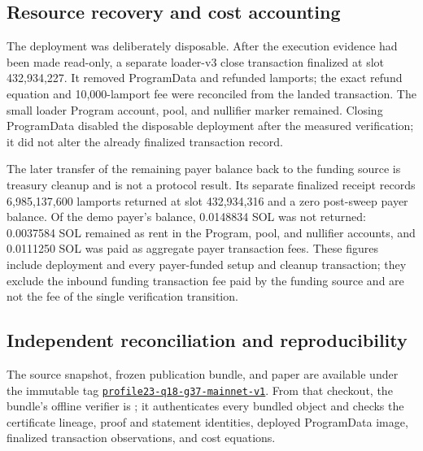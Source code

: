\subsection{Resource recovery and cost accounting}
\label{sec:evaluation-cleanup}

The deployment was deliberately disposable.  After the execution evidence
had been made read-only, a separate loader-v3 close transaction finalized at
slot 432,934,227.  It removed ProgramData and refunded
\ProfileProgramDataRefundLamports{} lamports; the exact refund equation and
10,000-lamport fee were reconciled from the landed transaction.  The small
loader Program account, pool, and nullifier marker remained.  Closing
ProgramData disabled the disposable deployment after the measured
verification; it did not alter the already finalized transaction record.

The later transfer of the remaining payer balance back to the funding source
is treasury cleanup and is not a protocol result.  Its separate finalized
receipt records 6,985,137,600 lamports returned at slot 432,934,316 and a zero
post-sweep payer balance.  Of the demo payer's balance, 0.0148834 SOL was not
returned: 0.0037584 SOL remained as rent in the Program, pool, and nullifier
accounts, and 0.0111250 SOL was paid as aggregate payer transaction fees.
These figures include deployment and every payer-funded setup and cleanup
transaction; they exclude the inbound funding transaction fee paid by the
funding source and are not the fee of the single verification transition.

\subsection{Independent reconciliation and reproducibility}
\label{sec:evaluation-reproduction}

The source snapshot, frozen publication bundle, and paper are available under
the immutable tag
\href{https://github.com/DJBarker87/zk/tree/profile23-q18-g37-mainnet-v1}{\texttt{profile23-q18-g37-mainnet-v1}}.
From that checkout, the bundle's offline verifier is
; it authenticates every
bundled object and checks the certificate lineage, proof and statement
identities, deployed ProgramData image, finalized transaction observations,
and cost equations.

